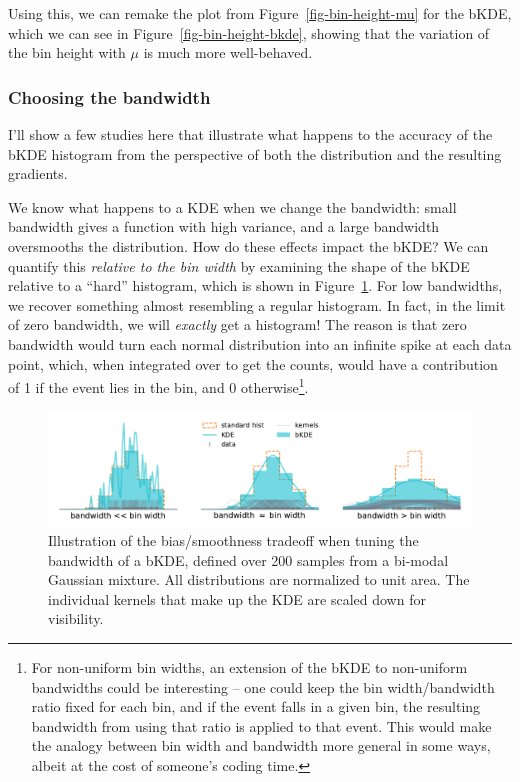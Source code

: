 \documentclass[
  11pt,
  numbers=noendperiod]{book}
\begin{document}
Using this, we can remake the plot from Figure~\ref{fig-bin-height-mu}
for the bKDE, which we can see in Figure~\ref{fig-bin-height-bkde},
showing that the variation of the bin height with \(\mu\) is much more
well-behaved.

\hypertarget{choosing-the-bandwidth}{%
\subsubsection*{Choosing the bandwidth}\label{choosing-the-bandwidth}}

I'll show a few studies here that illustrate what happens to the
accuracy of the bKDE histogram from the perspective of both the
distribution and the resulting gradients.

We know what happens to a KDE when we change the bandwidth: small
bandwidth gives a function with high variance, and a large bandwidth
oversmooths the distribution. How do these effects impact the bKDE? We
can quantify this \emph{relative to the bin width} by examining the
shape of the bKDE relative to a ``hard'' histogram, which is shown in
Figure~\ref{fig-bkde-bandwidth}. For low bandwidths, we recover
something almost resembling a regular histogram. In fact, in the limit
of zero bandwidth, we will \emph{exactly} get a histogram! The reason is
that zero bandwidth would turn each normal distribution into an infinite
spike at each data point, which, when integrated over to get the counts,
would have a contribution of 1 if the event lies in the bin, and 0
otherwise\footnote{For non-uniform bin widths, an extension of the bKDE
  to non-uniform bandwidths could be interesting -- one could keep the
  bin width/bandwidth ratio fixed for each bin, and if the event falls
  in a given bin, the resulting bandwidth from using that ratio is
  applied to that event. This would make the analogy between bin width
  and bandwidth more general in some ways, albeit at the cost of
  someone's coding time.}.

\begin{figure}

{\centering \includegraphics{./images/relaxed_hist.pdf}

}

\caption{\label{fig-bkde-bandwidth}Illustration of the bias/smoothness
tradeoff when tuning the bandwidth of a bKDE, defined over 200 samples
from a bi-modal Gaussian mixture. All distributions are normalized to
unit area. The individual kernels that make up the KDE are scaled down
for visibility.}

\end{figure}
\end{document}
